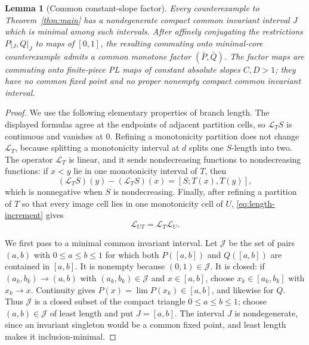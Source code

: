\documentclass[11pt]{article}
\newtheorem{lemma}[theorem]{Lemma}
\newcommand{\I}{[0,1]}
\begin{document}
\begin{lemma}[Common constant-slope factor]\label{lem:linearize}
Every counterexample to Theorem~\ref{thm:main} has a nondegenerate compact common invariant
interval $J$ which is minimal among such intervals. After affinely conjugating the restrictions
$P|_J,Q|_J$ to maps of $\I$, the resulting commuting onto minimal-core counterexample admits a
common monotone factor $(\bar P,\bar Q)$. The factor maps are commuting onto finite-piece PL maps of
constant absolute slopes $C,D>1$; they have no common fixed point and no proper nonempty compact
common invariant interval.
\end{lemma}

\begin{proof}
We use the following elementary properties of branch length. The displayed formulas agree at the endpoints
of adjacent partition cells, so $\mathcal L_TS$ is continuous and vanishes at $0$. Refining a
monotonicity partition does not change $\mathcal L_T$, because splitting a monotonicity interval at
$d$ splits one $S$-length into two. The operator $\mathcal L_T$ is linear, and it sends
nondecreasing functions to nondecreasing functions:
if $x<y$ lie in one monotonicity interval of $T$, then
\begin{equation}\label{eq:length-increment}
(\mathcal L_TS)(y)-(\mathcal L_TS)(x)=[S;T(x),T(y)],
\end{equation}
which is nonnegative when $S$ is nondecreasing. Finally, after refining a partition of $T$ so that every
image cell lies in one monotonicity cell of $U$, \eqref{eq:length-increment} gives
\begin{equation}\label{eq:length-composition}
\mathcal L_{UT}=\mathcal L_T\mathcal L_U.
\end{equation}

We first pass to a minimal common invariant interval. Let $\mathscr J$ be the set of pairs $(a,b)$
with $0\le a\le b\le1$ for which both $P([a,b])$ and $Q([a,b])$ are contained in $[a,b]$.
It is nonempty because $(0,1)\in\mathscr J$. It is closed: if
$(a_k,b_k)\to(a,b)$ with $(a_k,b_k)\in\mathscr J$ and $x\in[a,b]$, choose
$x_k\in[a_k,b_k]$ with $x_k\to x$. Continuity gives
$P(x)=\lim P(x_k)\in[a,b]$, and likewise for $Q$. Thus $\mathscr J$ is a closed subset of the
compact triangle $0\le a\le b\le1$; choose $(a,b)\in\mathscr J$ of least length and put
$J=[a,b]$. The interval $J$ is nondegenerate, since an invariant singleton would be a common fixed
point, and least length makes it inclusion-minimal.


\end{proof}
\end{document}
